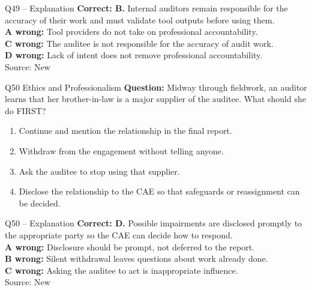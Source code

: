 \documentclass[aspectratio=169,10pt]{beamer}
\begin{document}
\begin{frame}[t]{Q49 -- Explanation}
	\footnotesize
	\textbf{Correct: B.} Internal auditors remain responsible for the accuracy of their work and must validate tool outputs before using them. \\[5pt]
\textbf{A wrong:} Tool providers do not take on professional accountability. \\[3pt]
\textbf{C wrong:} The auditee is not responsible for the accuracy of audit work. \\[3pt]
\textbf{D wrong:} Lack of intent does not remove professional accountability. \\[3pt]
	\vfill {\tiny Source: New}
\end{frame}

\begin{frame}[t]{Q50 \hfill {\scriptsize Ethics and Professionalism}}
	\small
	\textbf{Question:} Midway through fieldwork, an auditor learns that her brother-in-law is a major supplier of the auditee. What should she do FIRST?
	\begin{enumerate}[label=\Alph*.,itemsep=1pt,topsep=3pt]
			\item Continue and mention the relationship in the final report.
			\item Withdraw from the engagement without telling anyone.
			\item Ask the auditee to stop using that supplier.
			\item Disclose the relationship to the CAE so that safeguards or reassignment can be decided.
	\end{enumerate}
\end{frame}

\begin{frame}[t]{Q50 -- Explanation}
	\footnotesize
	\textbf{Correct: D.} Possible impairments are disclosed promptly to the appropriate party so the CAE can decide how to respond. \\[5pt]
\textbf{A wrong:} Disclosure should be prompt, not deferred to the report. \\[3pt]
\textbf{B wrong:} Silent withdrawal leaves questions about work already done. \\[3pt]
\textbf{C wrong:} Asking the auditee to act is inappropriate influence. \\[3pt]
	\vfill {\tiny Source: New}
\end{frame}
\end{document}
